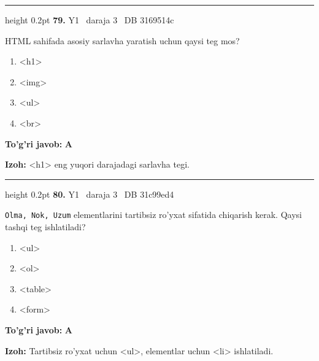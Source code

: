 \documentclass[10pt,a4paper,oneside]{article}
\begin{document}
\vspace{2mm}\hrule height 0.2pt \vspace{4mm}
\hypertarget{q79}{\textbf{\color{ink}79.}}  {\color{muted}\scriptsize Y1 \textbullet\ daraja 3 \textbullet\ DB 3169514c}
\par
HTML sahifada asosiy sarlavha yaratish uchun qaysi teg mos?
\begin{enumerate}[label=\Alph*),leftmargin=9mm]
\item \textless{}h1\textgreater{}
\item \textless{}img\textgreater{}
\item \textless{}ul\textgreater{}
\item \textless{}br\textgreater{}
\end{enumerate}
\begin{tcolorbox}[enhanced,breakable,colback=teal!4,colframe=teal!45!black,boxrule=0.45pt,arc=1.2mm,left=2.8mm,right=2.8mm,top=2mm,bottom=2mm,before skip=2mm,after skip=2mm]
\textbf{\color{teal}To'g'ri javob:} \textbf{A}
\par\smallskip
\textbf{Izoh:} \textless{}h1\textgreater{} eng yuqori darajadagi sarlavha tegi.
\end{tcolorbox}
\vspace{2mm}\hrule height 0.2pt \vspace{4mm}
\hypertarget{q80}{\textbf{\color{ink}80.}}  {\color{muted}\scriptsize Y1 \textbullet\ daraja 3 \textbullet\ DB 31c99ed4}
\par
\texttt{Olma, Nok, Uzum} elementlarini tartibsiz ro'yxat sifatida chiqarish kerak. Qaysi tashqi teg ishlatiladi?
\begin{enumerate}[label=\Alph*),leftmargin=9mm]
\item \textless{}ul\textgreater{}
\item \textless{}ol\textgreater{}
\item \textless{}table\textgreater{}
\item \textless{}form\textgreater{}
\end{enumerate}
\begin{tcolorbox}[enhanced,breakable,colback=teal!4,colframe=teal!45!black,boxrule=0.45pt,arc=1.2mm,left=2.8mm,right=2.8mm,top=2mm,bottom=2mm,before skip=2mm,after skip=2mm]
\textbf{\color{teal}To'g'ri javob:} \textbf{A}
\par\smallskip
\textbf{Izoh:} Tartibsiz ro'yxat uchun \textless{}ul\textgreater{}, elementlar uchun \textless{}li\textgreater{} ishlatiladi.
\end{tcolorbox}
\end{document}
